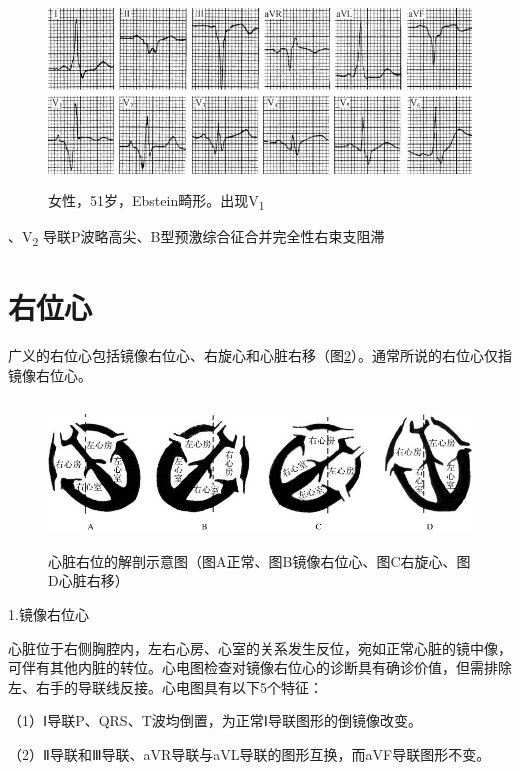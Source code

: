 \begin{figure}[!htbp]
 \centering
 \includegraphics[width=5.08333in,height=1.97917in]{./images/Image00688.jpg}
 \captionsetup{justification=centering}
 \caption{女性，51岁，Ebstein畸形。出现V\textsubscript{1}}
 \label{fig41-6}
  \end{figure} 
、V\textsubscript{2} 导联P波略高尖、B型预激综合征合并完全性右束支阻滞

\protect\hypertarget{text00049.htmlux5cux23subid585}{}{}

\section{右位心}

广义的右位心包括镜像右位心、右旋心和心脏右移（图\ref{fig41-7}）。通常所说的右位心仅指镜像右位心。

\begin{figure}[!htbp]
 \centering
 \includegraphics[width=5.58333in,height=1.54167in]{./images/Image00689.jpg}
 \captionsetup{justification=centering}
 \caption{心脏右位的解剖示意图（图A正常、图B镜像右位心、图C右旋心、图D心脏右移）}
 \label{fig41-7}
  \end{figure} 

1.镜像右位心

心脏位于右侧胸腔内，左右心房、心室的关系发生反位，宛如正常心脏的镜中像，可伴有其他内脏的转位。心电图检查对镜像右位心的诊断具有确诊价值，但需排除左、右手的导联线反接。心电图具有以下5个特征：

（1）Ⅰ导联P、QRS、T波均倒置，为正常Ⅰ导联图形的倒镜像改变。

（2）Ⅱ导联和Ⅲ导联、aVR导联与aVL导联的图形互换，而aVF导联图形不变。

